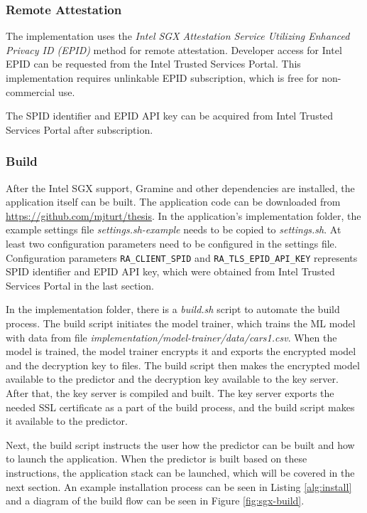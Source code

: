 \subsubsection{Remote Attestation} \label{remoteatt}

The implementation uses the \textit{Intel SGX Attestation Service Utilizing Enhanced Privacy ID (EPID)} method for remote attestation. Developer access for Intel EPID can be requested from the Intel Trusted Services Portal.\cite{intelportal} This implementation requires unlinkable EPID subscription, which is free for non-commercial use.

The SPID identifier and EPID API key can be acquired from Intel Trusted Services Portal after subscription.

\subsubsection{Build} \label{build}

After the Intel SGX support, Gramine and other dependencies are installed, the application itself can be built. The application code can be downloaded from \url{https://github.com/mjturt/thesis}. In the application's implementation folder, the example settings file \textit{settings.sh-example} needs to be copied to \textit{settings.sh}. At least two configuration parameters need to be configured in the settings file. Configuration parameters \texttt{RA_CLIENT_SPID} and \texttt{RA_TLS_EPID_API_KEY} represents SPID identifier and EPID API key, which were obtained from Intel Trusted Services Portal in the last section.

In the implementation folder, there is a \textit{build.sh} script to automate the build process. The build script initiates the model trainer, which trains the ML model with data from file \textit{implementation/model-trainer/data/cars1.csv}. When the model is trained, the model trainer encrypts it and exports the encrypted model and the decryption key to files. The build script then makes the encrypted model available to the predictor and the decryption key available to the key server. After that, the key server is compiled and built. The key server exports the needed SSL certificate as a part of the build process, and the build script makes it available to the predictor.

Next, the build script instructs the user how the predictor can be built and how to launch the application. When the predictor is built based on these instructions, the application stack can be launched, which will be covered in the next section. An example installation process can be seen in Listing \ref{alg:install} and a diagram of the build flow can be seen in Figure \ref{fig:sgx-build}.

